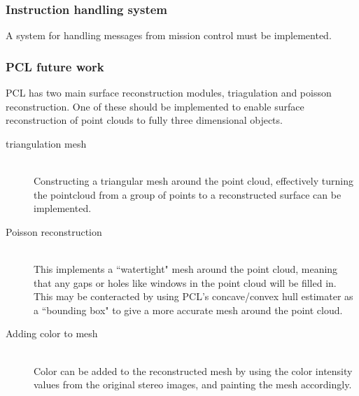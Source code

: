 \subsubsection{Instruction handling system}
A system for handling messages from mission control must be implemented.

\subsubsection{PCL future work}
PCL has two main surface reconstruction modules, triagulation and poisson reconstruction. One of these should be implemented to enable surface reconstruction of point clouds to fully three dimensional objects.
\begin{description}
\item[triangulation mesh]\hfill \\
Constructing a triangular mesh around the point cloud, effectively turning the pointcloud from a group of points to a reconstructed surface can be implemented.
\item[Poisson reconstruction]\hfill \\
This implements a ``watertight" mesh around the point cloud, meaning that any gaps or holes like windows in the point cloud will be filled in. This may be conteracted by using PCL's concave/convex hull estimater as a ``bounding box" to give a more accurate mesh around the point cloud.
\item[Adding color to mesh]\hfill \\
Color can be added to the reconstructed mesh by using the color intensity values from the original stereo images, and painting the mesh accordingly.
\end{description}



